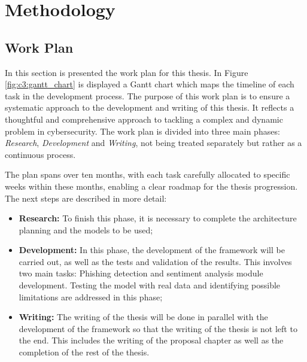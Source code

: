 \chapter{Methodology}
\label{chapter:methodology}


\section{Work Plan}

In this section is presented the work plan for this thesis. In Figure \ref{fig:c3:gantt_chart} is displayed a Gantt chart which maps the timeline of each task in the development process. The purpose of this work plan is to ensure a systematic approach to the development and writing of this thesis. It reflects a thoughtful and comprehensive approach to tackling a complex and dynamic problem in cybersecurity. The work plan is divided into three main phases: \textit{Research}, \textit{Development} and \textit{Writing}, not being treated separately but rather as a continuous process. 

The plan spans over ten months, with each task carefully allocated to specific weeks within these months, enabling a clear roadmap for the thesis progression. The next steps are described in more detail:
\begin{itemize}
    \item \textbf{Research:} To finish this phase, it is necessary to complete the architecture planning and the models to be used;
    \item \textbf{Development:} In this phase, the development of the framework will be carried out, as well as the tests and validation of the results. This involves two main tasks: Phishing detection and sentiment analysis module development. Testing the model with real data and identifying possible limitations are addressed in this phase;
    \item \textbf{Writing:} The writing of the thesis will be done in parallel with the development of the framework so that the writing of the thesis is not left to the end. This includes the writing of the proposal chapter as well as the completion of the rest of the thesis. 
\end{itemize}


